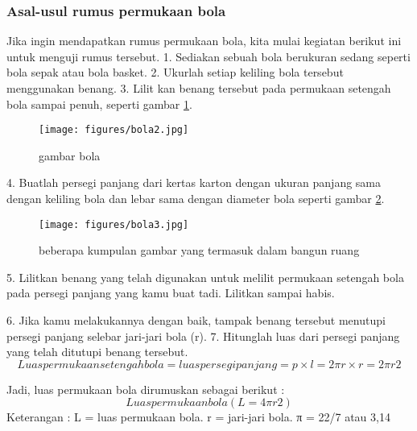 \subsubsection{Asal-usul rumus permukaan bola}
Jika ingin mendapatkan rumus permukaan bola, kita mulai kegiatan berikut ini untuk menguji rumus tersebut.
1. Sediakan sebuah bola berukuran sedang seperti bola sepak atau bola basket.
2. Ukurlah setiap keliling bola tersebut menggunakan benang.
3. Lilit kan benang tersebut pada permukaan setengah bola sampai penuh, seperti gambar \ref{bola2}.
\begin{figure}[ht]
    \centerline{\texttt{[image: figures/bola2.jpg]}}
    \caption{gambar bola}
    \label{bola2}
    \end{figure}
4. Buatlah persegi panjang dari kertas karton dengan ukuran panjang sama dengan keliling bola dan lebar sama dengan diameter bola seperti gambar \ref{bola3}.
\begin{figure}[ht]
    \centerline{\texttt{[image: figures/bola3.jpg]}}
    \caption{beberapa kumpulan gambar yang termasuk dalam bangun ruang}
    \label{bola3}
    \end{figure}

5. Lilitkan benang yang telah digunakan untuk melilit permukaan setengah bola pada persegi panjang yang kamu buat tadi. Lilitkan sampai habis.

6. Jika kamu melakukannya dengan baik, tampak benang tersebut menutupi persegi panjang selebar jari-jari bola (r).
7. Hitunglah luas dari persegi panjang yang telah ditutupi benang tersebut. 
\begin{equation}
Luas permukaan setengah bola = luas persegi panjang
                                           = p × l
                                           = 2πr× r
                                           = 2π r2
\end{equation}

Jadi, luas permukaan bola dirumuskan sebagai berikut :
\begin{equation}
Luas permukaan bola ( L = 4πr2 )
\end{equation}
Keterangan :
L = luas permukaan bola.
r = jari-jari bola.
π = 22/7 atau 3,14

